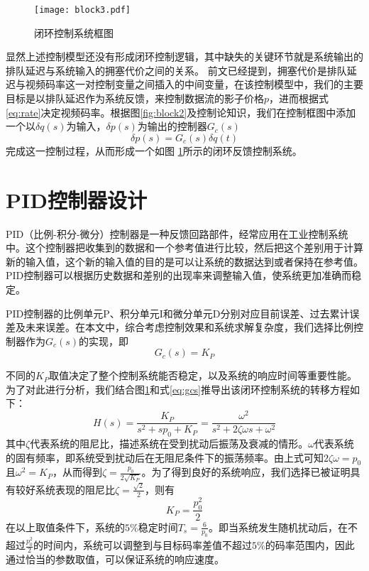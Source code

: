 \begin{figure}[htbp]
  \centering
  \texttt{[image: block3.pdf]}
  \caption{闭环控制系统框图}
  \label{fig:block3}
\end{figure}

显然上述控制模型还没有形成闭环控制逻辑，其中缺失的关键环节就是系统输出的排队延迟与系统输入的拥塞代价之间的关系。
前文已经提到，拥塞代价是排队延迟与视频码率这一对控制变量之间插入的中间变量，在该控制模型中，我们的主要目标是以排队延迟作为系统反馈，来控制数据流的影子价格$p$，进而根据式 \ref{eq:rate}决定视频码率。根据图\ref{fig:block2}及控制论知识，我们在控制框图中添加一个以$\delta q(s)$为输入，$\delta p(s)$为输出的控制器$G_c(s)$
\begin{equation}
\delta p(s) = G_c(s)\delta q(t)
\label{equ_x_dif}
\end{equation}
完成这一控制过程，从而形成一个如图 \ref{fig:block3}所示的闭环反馈控制系统。

\section{PID控制器设计}
PID（比例-积分-微分）控制器是一种反馈回路部件，经常应用在工业控制系统中。这个控制器把收集到的数据和一个参考值进行比较，然后把这个差别用于计算新的输入值，这个新的输入值的目的是可以让系统的数据达到或者保持在参考值。PID控制器可以根据历史数据和差别的出现率来调整输入值，使系统更加准确而稳定。

PID控制器的比例单元P、积分单元I和微分单元D分别对应目前误差、过去累计误差及未来误差。在本文中，综合考虑控制效果和系统求解复杂度，我们选择比例控制器作为$G_c(s)$的实现，即
\begin{equation}\label{eq:gcs}
    G_c(s) = K_P
\end{equation}

不同的$K_P$取值决定了整个控制系统能否稳定，以及系统的响应时间等重要性能。为了对此进行分析，我们结合图\ref{fig:block3}和式\ref{eq:gcs}推导出该闭环控制系统的转移方程如下：
\begin{equation}\label{eq:transfer}
    H(s) = \frac{K_P}{s^2 + s p_0 + K_P} = \frac{\omega^2}{s^2 + 2 \zeta \omega s + \omega^2}
\end{equation}
其中$\zeta$代表系统的阻尼比，描述系统在受到扰动后振荡及衰减的情形。$\omega$代表系统的固有频率，即系统受到扰动后在无阻尼条件下的振荡频率。由上式可知$2 \zeta \omega = p_0$ 且$\omega^2 = K_P$，从而得到$\zeta = \frac{p_0}{2\sqrt{K_P}}$。为了得到良好的系统响应，我们选择已被证明具有较好系统表现的阻尼比$\zeta = \frac{\sqrt{2}}{2}$\cite{franklin2006feedback}，则有
\begin{equation}\label{eq:k}
    K_P = \frac{p_0^2}{2}
\end{equation}
在以上取值条件下，系统的$5\%$稳定时间$T_s = \frac{6}{p_0}$。即当系统发生随机扰动后，在不超过$\frac{p_0^2}{2}$的时间内，系统可以调整到与目标码率差值不超过$5\%$的码率范围内，因此通过恰当的参数取值，可以保证系统的响应速度。


